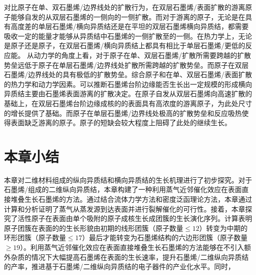     对比原子在单、双石墨烯/边界线处的扩散行为，在双层石墨烯/表面扩散的游离原子能够自发的从双层石墨烯的一侧向的一侧扩散。而对于游离的原子，无论是在具有高度差的单层石墨烯/横向异质结还是在平坦的双层石墨烯横向异质结，都需要吸收一定的能量才能够从异质结中石墨烯的一侧扩散至的一侧。在热力学上，无论是原子还是原子，在双层石墨烯/横向异质结上都具有相比于单层石墨烯/更低的反应能。
    从动力学的角度上看，对于原子在单、双层石墨烯/扩散所需要跨越的扩散势垒远低于原子在单层石墨烯/边界线处扩散所需跨越的扩散势垒。而原子在双层石墨烯/边界线处的具有极低的扩散势垒。综合原子和在单、双层石墨烯/表面扩散的热力学和动力学因素。可以推断石墨烯台阶边缘能否生长出一定规模的形成横向异质结主要由石墨烯表面游离的扩散决定。在原子自发从双层石墨烯向高速扩散的基础上，在双层石墨烯台阶边缘成核的的表面具有高浓度的游离原子，为此处尺寸的增长提供了基础。而原子在单层石墨烯/边界线处极高的扩散势垒和反应吸热使得表面缺乏游离的原子。原子的短缺会较大程度上阻碍了此处的继续生长。
    
    
\section{本章小结}
    本章对二维材料组成的纵向异质结和横向异质结的生长机理进行了初步探究。对于石墨烯/组成的二维纵向异质结，本章构建了一种利用蒸气近邻催化效应在表面直接堆叠生长石墨烯的方法。通过结合流体力学方法和密度泛函理论方法，本章通过计算和分析证明了蒸气从蒸发源到达表面并进行裂解催化的可行性。接着，本章探究了活性原子在表面由单个吸附的原子成核生长成团簇的生长演化序列。计算表明原子团簇在表面的的生长形貌由初期的线形团簇（原子数量$\leqslant 12$）转变为中期的环形团簇（原子数量$\leqslant 17$）最后才能转变为石墨烯结构的六边形团簇（原子数量 $\geqslant 19$）。利用蒸气近邻催化效应在表面直接堆叠生长石墨烯的方法能够在不引入额外杂质的情况下大幅提高石墨烯在表面的生长速率，提升石墨烯/二维纵向异质结的产率，推进基于石墨烯/二维纵向异质结的电子器件的产业化水平。同时，

